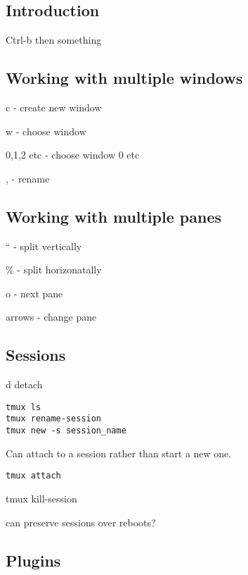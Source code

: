 
\subsection{Introduction}

Ctrl-b then something

\subsection{Working with multiple windows}

c - create new window

w - choose window

0,1,2 etc - choose window 0 etc

, - rename


\subsection{Working with multiple panes}

`` - split vertically

\% - split horizonatally

o - next pane

arrows - change pane


\subsection{Sessions}

d detach

\begin{verbatim}
tmux ls
tmux rename-session
tmux new -s session_name
\end{verbatim}

Can attach to a session rather than start a new one.
\begin{verbatim}
tmux attach
\end{verbatim}


tmux kill-session

can preserve sessions over reboots?

\subsection{Plugins}
